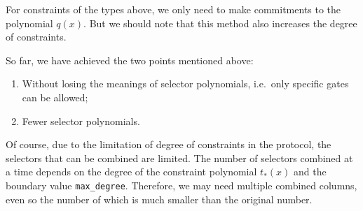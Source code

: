 For constraints of the types above, we only need to make commitments to the polynomial $q(x)$. But we should note that this method also increases the degree of constraints.

So far, we have achieved the two points mentioned above:
\begin{enumerate}
    \item Without losing the meanings of selector polynomials, i.e.\ only specific gates can be allowed;
    \item Fewer selector polynomials.
\end{enumerate}

Of course, due to the limitation of degree of constraints in the protocol, the selectors that can be combined are limited. The number of selectors combined at a time depends on the degree of the constraint polynomial $t_*(x)$ and the boundary value \verb|max_degree|. Therefore, we may need multiple combined columns, even so the number of which is much smaller than the original number.
